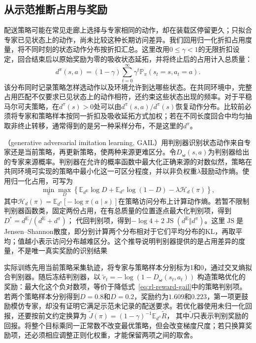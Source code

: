 \subsection{从示范推断占用与奖励}
\label{sec:rl-reward-occupancy-irl}

配送策略可能在常见走廊上选择与专家相同的动作，却在装载区停留更久；只拟合专家已见状态上的动作，尚未比较这种长期访问差异。我们回用归一化折扣占用度量，将不同时刻的状态动作分布按折扣汇总。这里改用$0\leq\gamma<1$的无限折扣设定，回合结束后以原始奖励为零的吸收状态延拓，并将终止后的占用计入总质量：
\begin{equation}
  d^\pi(s,a)=(1-\gamma)\sum_{t=0}^{\infty}
       \gamma^t\mathbb P_\pi(s_t=s,a_t=a).
  \label{eq:rl-reward-occupancy}
\end{equation}
该分布同时记录策略怎样选动作以及环境允许到达哪些状态。在共同环境中，完整占用匹配不仅要求已见状态上的动作相符，还约束这些状态出现的频率。对于平稳马尔可夫策略，在$d^\pi(s)>0$处可以由$d^\pi(s,a)/d^\pi(s)$恢复动作分布。比较前必须将专家和策略样本按同一折扣及吸收延拓方式加权；若在不同长度回合中均匀抽取非终止转移，通常得到的是另一种采样分布，不是这里的$d^\pi$。

（generative adversarial imitation learning, GAIL）用判别器识别状态动作来自专家还是当前策略，再更新策略，使两种来源更难区分。令$D_{\bm{\omega}}(s,a)$为判别器给出的专家来源概率。判别器在允许的概率函数中最大化正确来源的对数似然，策略在共同环境可实现的策略中最小化这一可区分程度，并以非负权重$\lambda$鼓励动作熵。使用归一化占用，可写为
\begin{equation}
  \min_\pi\max_D
  \left\{\mathbb E_{d^{\mathrm E}}\log D
    +\mathbb E_{d^\pi}\log(1-D)
    -\lambda\mathcal H_d(\pi)\right\},
  \label{eq:rl-reward-gail}
\end{equation}
其中$\mathcal H_d(\pi)=\mathbb E_{d^\pi}[-\log\pi(a\mid s)]$在策略访问分布上计算动作熵。若暂不限制判别器函数类，固定两份占用，在有总质量的位置逐点最大化判别项，得到
$D^*=d^{\mathrm E}/(d^{\mathrm E}+d^\pi)$；
代回判别项，得到$-\log4+2\operatorname{JS}(d^{\mathrm E}\Vert d^\pi)$。这里$\operatorname{JS}$是Jensen--Shannon散度，即分别计算两个分布相对于它们平均分布的KL，再取平均；值越小表示访问分布越难区分。这个推导说明判别器提供的是占用差异的度量，不是唯一真实奖励的识别结果

实际训练先用当前策略采集轨迹，将专家与策略样本分别标为1和0，通过交叉熵拟合判别器。随后冻结判别器，以
$\widetilde r_t=-\log(1-D_{\bm{\omega}}(s_t,a_t))$
构造策略优化的奖励：最大化这个负对数项，等价于降低式~\eqref{eq:rl-reward-gail}中的策略判别项。若两个策略样本分别得到$D=0.8$和$D=0.2$，奖励约为$1.609$和$0.223$，第一项更鼓励模仿专家，却没有证明它满足示范未记录的配送要求。若优化器使用未归一化回报，还要按前文约定换算为
$\widetilde J(\pi)=(1-\gamma)^{-1}\mathbb E_{d^\pi}\widetilde R$，
其中$\widetilde J$只表示判别奖励的回报。将整个目标乘同一正常数不改变最优策略，但会改变梯度尺度；若只换算奖励项，还必须相应调整正则化权重，才能保留两项之间的取舍。

